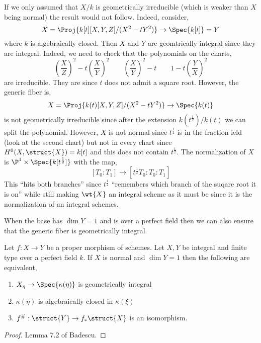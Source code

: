 \documentclass[12pt]{article}
\begin{document}
\begin{rmk}
If we only assumed that $X / k$ is geometrically irreducible (which is weaker than $X$ being normal) the result would not follow. Indeed, consider,
\[ X = \Proj{k[t][X,Y,Z]/(X^2 - t Y^2)} \to \Spec{k[t]} = Y \]
where $k$ is algebraically closed. Then $X$ and $Y$ are geomtrically integral since they are integral. Indeed, we need to check that the polynomials on the charts,
\[ \left( \frac{X}{Z} \right)^2 - t \left( \frac{X}{Y} \right)^2 \quad \quad \left( \frac{X}{Y} \right)^2 - t \quad \quad 1 - t \left( \frac{Y}{X} \right)^2 \]
are irreducible. They are since $t$ does not admit a square root. However, the generic fiber is,
\[ X = \Proj{k(t)[X,Y,Z]/(X^2 - t Y^2)} \to \Spec{k(t)} \]
is not geometrically irreducible since after the extension $k(t^{\frac{1}{2}}) / k(t)$ we can split the polynomial. However, $X$ is not normal since $t^{\frac{1}{2}}$ is in the fraction ield (look at the second chart) but not in every chart since $H^0(X, \struct{X}) = k[t]$ and this does not contain $t^{\frac{1}{2}}$. The normalization of $X$ is $\P^1 \times \Spec{k[t^{\frac{1}{2}}]}$ with the map,
\[ [T_0 : T_1] \to [t^{\frac{1}{2}} T_0 : T_0 : T_1] \]
This ``hits both branches'' since $t^{\frac{1}{2}}$ ``remembers which branch of the suqare root it is on'' while still making $\wt{X}$ an integral scheme as it must be since it is the normalization of an integral schemes.
\end{rmk}

\begin{rmk}
When the base has $\dim{Y} = 1$ and is over a perfect field then we can also ensure that the generic fiber is geometrically integral.
\end{rmk}

\begin{prop}
Let $f : X \to Y$ be a proper morphism of schemes. Let $X,Y$ be integral and finite type over a perfect field $k$. If $X$ is normal and $\dim{Y} = 1$ then the following are equivalent,
\begin{enumerate}
\item $X_\eta \to \Spec{\kappa(\eta)}$ is geometrically integral
\item $\kappa(\eta)$ is algebraically closed in $\kappa(\xi)$
\item $f^{\#} : \struct{Y} \to f_* \struct{X}$ is an isomorphism.
\end{enumerate}
\end{prop}

\begin{proof}
Lemma 7.2 of Badescu. 
\end{proof}
\end{document}
